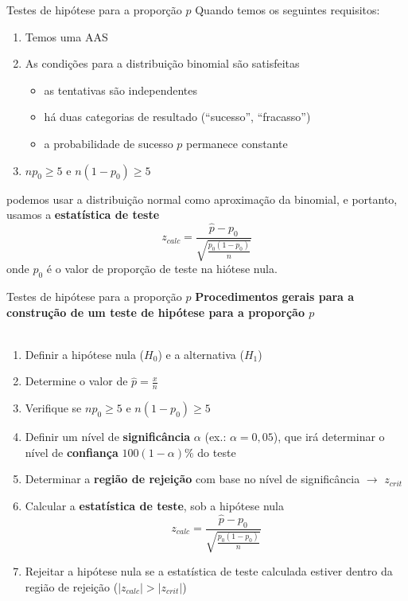 \documentclass[10pt]{beamer}\usepackage[]{graphicx}\usepackage[]{color}
\theoremstyle{definition}
\begin{document}
\begin{frame}{Testes de hipótese para a proporção $p$}
  Quando temos os seguintes requisitos:
  \begin{enumerate}
  \item Temos uma AAS
  \item As condições para a distribuição binomial são satisfeitas
    \begin{itemize}
    \item as tentativas são independentes
    \item há duas categorias de resultado (``sucesso'', ``fracasso'')
    \item a probabilidade de sucesso $p$ permanece constante
    \end{itemize}
  \item $np_0 \geq 5$ e $n(1-p_0) \geq 5$
  \end{enumerate}
  podemos usar a distribuição normal como aproximação da binomial, e
  portanto, usamos a \textbf{estatística de teste}
  \begin{equation*}
    z_{calc} = \frac{\hat{p} - p_0}{\sqrt{\frac{p_0(1-p_0)}{n}}}
  \end{equation*}
  onde $p_0$ é o valor de proporção de teste na hiótese nula.
\end{frame}

\begin{frame}{Testes de hipótese para a proporção $p$}
  \textbf{Procedimentos gerais para a construção de um teste de hipótese
    para a proporção $p$} \\~\\
  \begin{enumerate}
  \item Definir a hipótese nula ($H_0$) e a alternativa ($H_1$)
  \item Determine o valor de $\hat{p} = \frac{x}{n}$
  \item Verifique se $np_0 \geq 5$ e $n(1-p_0) \geq 5$
  \item Definir um nível de \textbf{significância} $\alpha$ (ex.: $\alpha
    = 0,05$), que irá determinar o nível de \textbf{confiança}
    $100(1-\alpha)\%$ do teste
  \item Determinar a \textbf{região de rejeição} com base no nível de
    significância $\rightarrow$ $z_{crit}$
  \item Calcular a \textbf{estatística de teste}, sob a hipótese nula
    \begin{equation*}
      z_{calc} = \frac{\hat{p} - p_0}{\sqrt{\frac{p_0(1-p_0)}{n}}}
    \end{equation*}
  \item Rejeitar a hipótese nula se a estatística de teste calculada
    estiver dentro da região de rejeição ($|z_{calc}| > |z_{crit}|$)
  \end{enumerate}
\end{frame}
\end{document}
